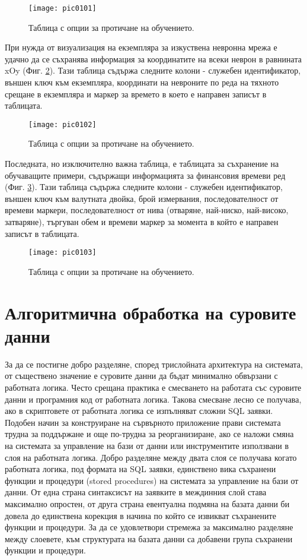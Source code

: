 \begin{figure}[h]
  \centering
  \texttt{[image: pic0101]}
  \caption{Таблица с опции за протичане на обучението.}
\label{fig:pic0101}
\end{figure}
\FloatBarrier

При нужда от визуализация на екземпляра за изкуствена невронна мрежа е удачно да се съхранява информация за координатите на всеки неврон в равнината xOy (Фиг. \ref{fig:pic0102}). Тази таблица съдържа следните колони - служебен идентификатор, външен ключ към екземпляра, координати на невроните по реда на тяхното срещане в екземпляра и маркер за времето в което е направен записът в таблицата. 

\begin{figure}[h]
  \centering
  \texttt{[image: pic0102]}
  \caption{Таблица с опции за протичане на обучението.}
\label{fig:pic0102}
\end{figure}
\FloatBarrier

Последната, но изключително важна таблица, е таблицата за съхранение на обучаващите примери, съдържащи информацията за финансовия времеви ред (Фиг. \ref{fig:pic0103}). Тази таблица съдържа следните колони - служебен идентификатор, външен ключ към валутната двойка, брой измервания, последователност от времеви маркери, последователност от нива (отваряне, най-ниско, най-високо, затваряне), търгуван обем и времеви маркер за момента в който е направен записът в таблицата. 

\begin{figure}[h]
  \centering
  \texttt{[image: pic0103]}
  \caption{Таблица с опции за протичане на обучението.}
\label{fig:pic0103}
\end{figure}
\FloatBarrier

\section{Алгоритмична обработка на суровите данни}

За да се постигне добро разделяне, според трислойната архитектура на системата, от съществено значение е суровите данни да бъдат минимално обвързани с работната логика. Често срещана практика е смесването на работата със суровите данни и програмния код от работната логика. Такова смесване лесно се получава, ако в скриптовете от работната логика се изпълняват сложни SQL заявки. Подобен начин за конструиране на сървърното приложение прави системата трудна за поддържане и още по-трудна за реорганизиране, ако се наложи смяна на системата за управление на бази от данни или инструментите използвани в слоя на работната логика. Добро разделяне между двата слоя се получава когато работната логика, под формата на SQL заявки, единствено вика съхранени функции и процедури (stored procedures) на системата за управление на бази от данни. От една страна синтаксисът на заявките в междинния слой става максимално опростен, от друга страна евентуална подмяна на базата данни би довела до единствена корекция в начина по който се извикват съхранените функции и процедури. За да се удовлетвори стремежа за максимално разделяне между слоевете, към структурата на базата данни са добавени група съхранени функции и процедури. 

